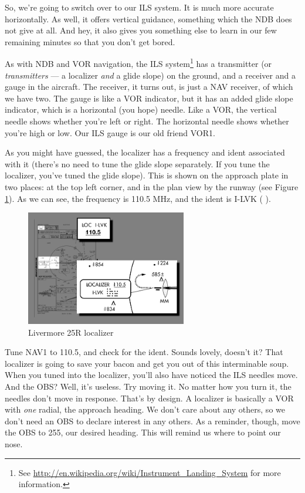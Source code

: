 So, we're going to switch over to our ILS system.  It is much more
accurate horizontally.  As well, it offers vertical guidance,
something which the NDB does not give at all.  And hey, it also gives
you something else to learn in our few remaining minutes so that you
don't get bored.

As with NDB and VOR navigation, the ILS system\footnote{See
  \url{http://en.wikipedia.org/wiki/Instrument_Landing_System} for
  more information.} has a transmitter (or \emph{transmitters} --- a
localizer \emph{and} a glide slope) on the ground, and a receiver and
a gauge in the aircraft.  The receiver, it turns out, is just a NAV
receiver, of which we have two.  The gauge is like a VOR indicator,
but it has an added glide slope indicator, which is a horizontal (you
hope) needle.  Like a VOR, the vertical needle shows whether you're
left or right.  The horizontal needle shows whether you're high or
low.  Our ILS gauge is our old friend VOR1.

As you might have guessed, the localizer has a frequency and ident
associated with it (there's no need to tune the glide slope
separately.  If you tune the localizer, you've tuned the glide slope).
This is shown on the approach plate in two places: at the top left
corner, and in the plan view by the runway (see Figure
\ref{fig:localizer}).  As we can see, the frequency is 110.5 MHz, and
the ident is I-LVK (\mdot\mdot\mspace \mdot\mdash\mdot\mdot\mspace
\mdot\mdot\mdot\mdash\mspace \mdash\mdot\mdash).


\begin{figure}
  \begin{center}
    \includegraphics[width=7cm]{img/localizer}
    \caption{Livermore 25R localizer}
    \label{fig:localizer}
  \end{center}
\end{figure}

Tune NAV1 to 110.5, and check for the ident.  Sounds lovely, doesn't
it?  That localizer is going to save your bacon and get you out of
this interminable soup.  When you tuned into the localizer, you'll
also have noticed the ILS needles move.  And the OBS?  Well, it's
useless.  Try moving it.  No matter how you turn it, the needles don't
move in response.  That's by design.  A localizer is basically a VOR
with \emph{one} radial, the approach heading.  We don't care about any
others, so we don't need an OBS to declare interest in any others.  As
a reminder, though, move the OBS to 255, our desired heading.  This
will remind us where to point our nose.

